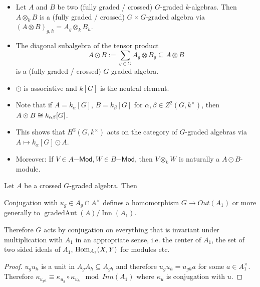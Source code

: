 \begin{example}
\begin{itemize}
\item  Let $A$ and $B$ be two (fully graded / crossed) $G$-graded $k$-algebras. Then $A\otimes_k B$ is a (fully graded / crossed) $G\times G$-graded algebra via $(A\otimes B)_{g,h} = A_g\otimes_k B_h$.

\item The diagonal subalgebra of the tensor product
\[A \odot B := \sum_{g\in G} A_g\otimes B_g \subseteq A\otimes B\]
is a (fully graded / crossed) $G$-graded algebra.

\item $\odot$ is associative and $k[G]$ is the neutral element.

\item Note that if $A=k_\alpha[G]$, $B=k_\beta[G]$ for $\alpha,\beta\in Z^2(G,k^\times)$, then $A\odot B \cong k_{\alpha\beta}[G]$.

\item This shows that $H^2(G,k^\times)$ acts on the category of $G$-graded algebras via $A\mapsto k_\alpha[G] \odot A$.

\item Moreover: If $V\in A\mathsf{-Mod}, W\in B\mathsf{-Mod}$, then $V \otimes_k W$ is naturally a $A\odot B$-module.
\end{itemize}
\end{example}

\begin{proposition}
Let $A$ be a crossed $G$-graded algebra. Then

Conjugation with $u_g\in A_g\cap A^\times$ defines a homomorphism $G\to Out(A_1)$ or more generally to $\operatorname{gradedAut}(A)/\operatorname{Inn}(A_1)$.

Therefore $G$ acts by conjugation on everything that is invariant under multiplication with $A_1$ in an appropriate sense, i.e. the center of $A_1$, the set of two sided ideals of $A_1$, $\operatorname{Hom}_{A_1}(X,Y)$ for modules etc.
\end{proposition}
\begin{proof}
$u_g u_h$ is a unit in $A_g A_h\subseteq A_{gh}$ and therefore $u_g u_h=u_{gh} a$ for some $a\in A_1^\times$. Therefore $\kappa_{u_{gh}} \equiv \kappa_{u_g}\circ\kappa_{u_h} \mod Inn(A_1)$ where $\kappa_u$ is conjugation with $u$.
\end{proof}